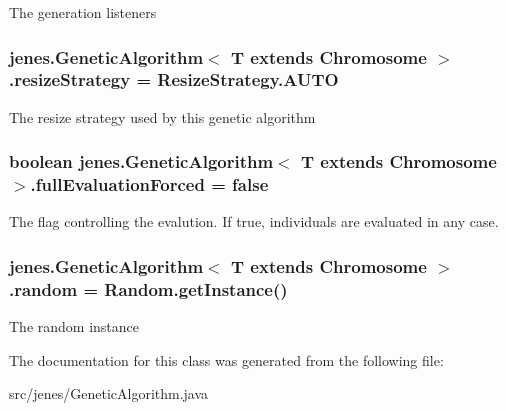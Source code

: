 The generation listeners \hypertarget{classjenes_1_1_genetic_algorithm_3_01_t_01extends_01_chromosome_01_4_56f08a1d1f3355921b83f08745dbb3b3}{
\subsubsection[resizeStrategy]{ jenes.GeneticAlgorithm$<$ T extends Chromosome $>$.{\bf resizeStrategy} = ResizeStrategy.AUTO}}
\label{classjenes_1_1_genetic_algorithm_3_01_t_01extends_01_chromosome_01_4_56f08a1d1f3355921b83f08745dbb3b3}


The resize strategy used by this genetic algorithm \hypertarget{classjenes_1_1_genetic_algorithm_3_01_t_01extends_01_chromosome_01_4_db627d0c6d6744f53ef5c3b7506913e9}{
\subsubsection[fullEvaluationForced]{\setlength{\rightskip}{0pt plus 5cm}boolean jenes.GeneticAlgorithm$<$ T extends Chromosome $>$.{\bf fullEvaluationForced} = false}}
\label{classjenes_1_1_genetic_algorithm_3_01_t_01extends_01_chromosome_01_4_db627d0c6d6744f53ef5c3b7506913e9}


The flag controlling the evalution. If true, individuals are evaluated in any case. \hypertarget{classjenes_1_1_genetic_algorithm_3_01_t_01extends_01_chromosome_01_4_1579283e210144ba90b937be0911a028}{
\subsubsection[random]{ jenes.GeneticAlgorithm$<$ T extends Chromosome $>$.{\bf random} = Random.getInstance()}}
\label{classjenes_1_1_genetic_algorithm_3_01_t_01extends_01_chromosome_01_4_1579283e210144ba90b937be0911a028}


The random instance 

The documentation for this class was generated from the following file:\begin{CompactItemize}
\item 
src/jenes/GeneticAlgorithm.java\end{CompactItemize}
